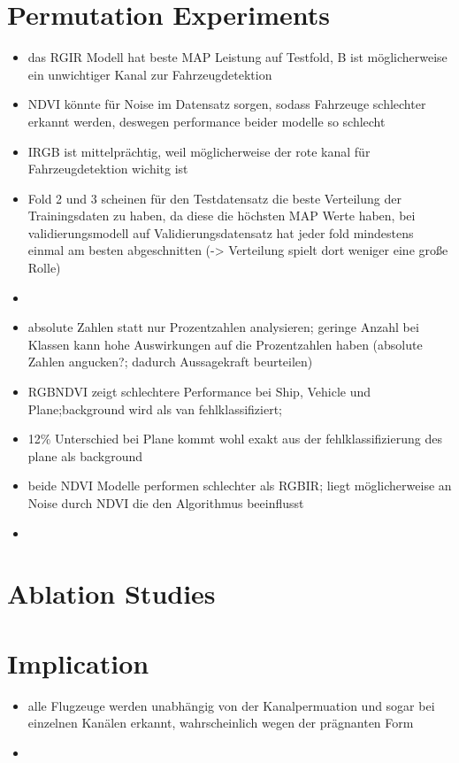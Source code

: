 \section*{Permutation Experiments}
\begin{itemize}
    \item das RGIR Modell hat beste MAP Leistung auf Testfold, B ist möglicherweise ein unwichtiger Kanal zur Fahrzeugdetektion
    \item NDVI könnte für Noise im Datensatz sorgen, sodass Fahrzeuge schlechter erkannt werden, deswegen performance beider modelle so schlecht
    \item IRGB ist mittelprächtig, weil möglicherweise der rote kanal für Fahrzeugdetektion wichitg ist 
    \item Fold 2 und 3 scheinen für den Testdatensatz die beste Verteilung der Trainingsdaten zu haben, da diese die höchsten MAP Werte haben, bei validierungsmodell auf Validierungsdatensatz hat jeder fold mindestens einmal am besten abgeschnitten (-> Verteilung spielt dort weniger eine große Rolle) 
\end{itemize}
\begin{itemize}
    \item {}
    \item absolute Zahlen statt nur Prozentzahlen analysieren; geringe Anzahl bei Klassen kann hohe Auswirkungen auf die Prozentzahlen haben (absolute Zahlen angucken?; dadurch Aussagekraft beurteilen)
\end{itemize}
\begin{itemize}
    \item \acrshort{RGBNDVI} zeigt schlechtere Performance bei Ship, Vehicle und Plane;background wird als van fehlklassifiziert; 
    \item 12\% Unterschied bei Plane kommt wohl exakt aus der fehlklassifizierung des plane als background
    \item beide NDVI Modelle performen schlechter als RGBIR; liegt möglicherweise an Noise durch NDVI die den Algorithmus beeinflusst
    \item 
\end{itemize}
\section*{Ablation Studies}
\section*{Implication}
\begin{itemize}
    \item alle Flugzeuge werden unabhängig von der Kanalpermuation und sogar bei einzelnen Kanälen erkannt, wahrscheinlich wegen der prägnanten Form 
    \item 
\end{itemize}

